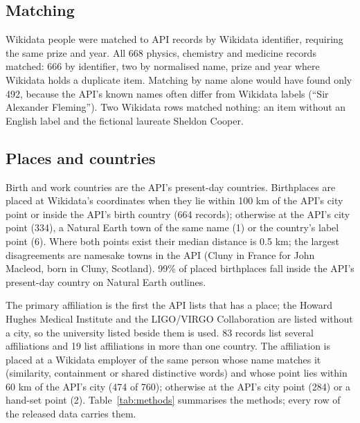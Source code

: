 \documentclass[11pt,a4paper]{article}
\begin{document}
\subsection{Matching}
Wikidata people were matched to API records by Wikidata identifier, requiring the same prize and year. All 668 physics, chemistry and medicine records matched: 666 by identifier, two by normalised name, prize and year where Wikidata holds a duplicate item. Matching by name alone would have found only 492, because the API's known names often differ from Wikidata labels (``Sir Alexander Fleming''). Two Wikidata rows matched nothing: an item without an English label and the fictional laureate Sheldon Cooper.

\subsection{Places and countries}
Birth and work countries are the API's present-day countries. Birthplaces are placed at Wikidata's coordinates when they lie within 100 km of the API's city point or inside the API's birth country (664 records); otherwise at the API's city point (334), a Natural Earth town of the same name (1) or the country's label point (6). Where both points exist their median distance is 0.5 km; the largest disagreements are namesake towns in the API (Cluny in France for John Macleod, born in Cluny, Scotland). 99\% of placed birthplaces fall inside the API's present-day country on Natural Earth outlines.

The primary affiliation is the first the API lists that has a place; the Howard Hughes Medical Institute and the LIGO/VIRGO Collaboration are listed without a city, so the university listed beside them is used. 83 records list several affiliations and 19 list affiliations in more than one country. The affiliation is placed at a Wikidata employer of the same person whose name matches it (similarity, containment or shared distinctive words) and whose point lies within 60 km of the API's city (474 of 760); otherwise at the API's city point (284) or a hand-set point (2). Table~\ref{tab:methods} summarises the methods; every row of the released data carries them.
\end{document}
